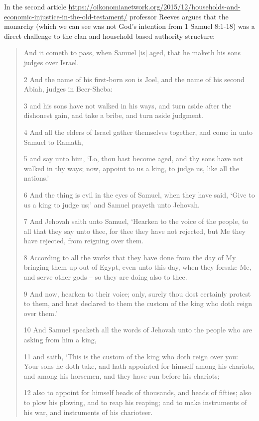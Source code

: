 \documentclass[11pt]{article}
\begin{document}
In the second article \url{https://oikonomianetwork.org/2015/12/households-and-economic-injustice-in-the-old-testament/} professor Reeves argues that the monarchy (which we can see was not God's intention from 1 Samuel 8:1-18) was a direct challenge to the clan and household based authority structure:

\begin{quote}
And it cometh to pass, when Samuel [is] aged, that he maketh his sons judges over Israel.

2 And the name of his first-born son is Joel, and the name of his second Abiah, judges in Beer-Sheba:

3 and his sons have not walked in his ways, and turn aside after the dishonest gain, and take a bribe, and turn aside judgment.

4 And all the elders of Israel gather themselves together, and come in unto Samuel to Ramath,

5 and say unto him, `Lo, thou hast become aged, and thy sons have not walked in thy ways; now, appoint to us a king, to judge us, like all the nations.'

6 And the thing is evil in the eyes of Samuel, when they have said, `Give to us a king to judge us;' and Samuel prayeth unto Jehovah.

7 And Jehovah saith unto Samuel, `Hearken to the voice of the people, to all that they say unto thee, for thee they have not rejected, but Me they have rejected, from reigning over them.

8 According to all the works that they have done from the day of My bringing them up out of Egypt, even unto this day, when they forsake Me, and serve other gods -- so they are doing also to thee.

9 And now, hearken to their voice; only, surely thou dost certainly protest to them, and hast declared to them the custom of the king who doth reign over them.'

10 And Samuel speaketh all the words of Jehovah unto the people who are asking from him a king,

11 and saith, `This is the custom of the king who doth reign over you: Your sons he doth take, and hath appointed for himself among his chariots, and among his horsemen, and they have run before his chariots;

12 also to appoint for himself heads of thousands, and heads of fifties; also to plow his plowing, and to reap his reaping; and to make instruments of his war, and instruments of his charioteer.


\end{quote}
\end{document}
